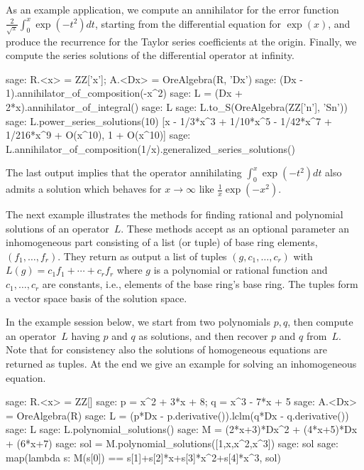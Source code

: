 \documentclass[11pt]{amsart}
\begin{document}
\smallskip

As an example application, we compute an annihilator for the error function
$\frac{2}{\sqrt{\pi}} \int_0^x \exp(-t^2) dt$, starting from the differential
equation for $\exp(x)$, and produce the recurrence for the Taylor series
coefficients at the origin. Finally, we compute the series solutions of the
differential operator at infinity. 

\begin{sageexample}
  sage: R.<x> = ZZ['x']; A.<Dx> = OreAlgebra(R, 'Dx')                            
  sage: (Dx - 1).annihilator_of_composition(-x^2)
  sage: L = (Dx + 2*x).annihilator_of_integral()                                     
  sage: L
  sage: L.to_S(OreAlgebra(ZZ['n'], 'Sn'))                          
  sage: L.power_series_solutions(10)                               
  [x - 1/3*x^3 + 1/10*x^5 - 1/42*x^7 + 1/216*x^9 + O(x^10), 1 + O(x^10)]
  sage: L.annihilator_of_composition(1/x).generalized_series_solutions()
\end{sageexample}

The last output implies that the operator annihilating $\int_0^x \exp(-t^2) dt$
also admits a solution which behaves for $x\to\infty$ like $\frac1x\exp(-x^2)$.

The next example illustrates the methods for finding rational and polynomial
solutions of an operator~$L$.  These methods accept as an optional parameter an
inhomogeneous part consisting of a list (or tuple) of base ring elements,
$(f_1,\dots,f_r)$. They return as output a list of tuples $(g,c_1,\dots,c_r)$
with $L(g)=c_1f_1+\cdots+c_rf_r$ where $g$ is a polynomial or rational function
and $c_1,\dots,c_r$ are constants, i.e., elements of the base ring's base
ring. The tuples form a vector space basis of the solution space.

In the example session below, we start from two polynomials $p,q$, then compute an 
operator~$L$ having $p$ and $q$ as solutions, and then recover $p$ and $q$ from~$L$.
Note that for consistency also the solutions of homogeneous equations are returned as 
tuples. At the end we give an example for solving an inhomogeneous equation.

\begin{sageexample}
  sage: R.<x> = ZZ[]
  sage: p = x^2 + 3*x + 8; q = x^3 - 7*x + 5
  sage: A.<Dx> = OreAlgebra(R)
  sage: L = (p*Dx - p.derivative()).lclm(q*Dx - q.derivative())
  sage: L
  sage: L.polynomial_solutions()
  sage: M = (2*x+3)*Dx^2 + (4*x+5)*Dx + (6*x+7)
  sage: sol = M.polynomial_solutions([1,x,x^2,x^3])
  sage: sol
  sage: map(lambda s: M(s[0]) == s[1]+s[2]*x+s[3]*x^2+s[4]*x^3, sol)
\end{sageexample}
\end{document}
